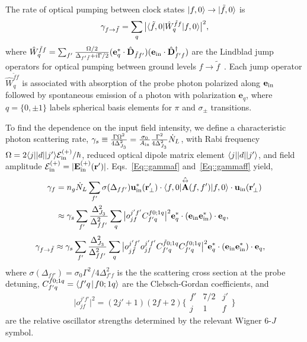 The rate of optical pumping between clock states $\ket{f,0} \rightarrow \ket{\tilde{f},0}$ is
	\begin{equation}\label{Eq::gammaff}
		\gamma_{f \rightarrow \tilde{f} } 
		=\sum_{q}\big| \bra{\tilde{f},0} \hat{W}_q^{\tilde{f}f} \ket{f,0} \big|^2,
	\end{equation}
where $ \hat{W}_q^{\tilde{f}f} = \sum_{f'}\frac{\Omega/2}{\Delta_{f'\tilde{f}}+i\Gamma/2}(\mathbf{e}_q^*\cdot\hat{\mathbf{D}}_{\tilde{f} f'} )(\mathbf{e}_{\rm in}\cdot \hat{\mathbf{D}}^\dagger_{f'f} ) $ are the Lindblad jump operators for optical pumping between ground levels $ f\rightarrow \tilde{f} $~\cite{deutsch_quantum_2010}. 
Each jump operator $\hat{W}_q^{\tilde{f}f}$ is associated with absorption of the probe photon polarized along $ \mathbf{e}_{\rm in} $ followed by spontaneous emission of a photon with polarization $ \mathbf{e}_q $, where $q= \{0,\pm 1\}$ labels spherical basis elements for $\pi$ and $ \sigma_\pm$ transitions.  

To find the dependence on the input field intensity, we define a characteristic photon scattering rate, $\gamma_s \equiv \frac{\Gamma\Omega^2}{4\Delta_{J_3}^2}= \frac{\sigma_0}{A_{\rm in}}\frac{\Gamma^2}{4 \Delta_{J_3}^2} \dot{N}_L $, with Rabi frequency $ \Omega=2\bra{j}|d|\ket{j'}\mathcal{E}^{(+)}_{\rm in}/\hbar $, reduced optical dipole matrix element $\bra{j}|d|\ket{j'}$, and field amplitude $ \mathcal{E}^{(+)}_{\rm in}=|\mathbf{E}_{\rm in}^{(+)}(\br')| $.
Eqs.~\eqref{Eq::gammaf} and~\eqref{Eq::gammaff} yield,
\begin{subequations}
	\begin{align}
		\gamma_f &=n_g\dot{N}_L  \sum_{f'} \sigma (\Delta_{ff'} ) \mathbf{u}^*_\inp(\br'_\perp)\cdot \bra{f,0} \hat{\tensor{\mbf{A}}}(f,f') \ket{f,0}  \cdot \mathbf{u}_\inp(\br'_\perp)\\
		&\approx  \gamma_s \sum_{f'} \frac{\Delta_{J_3}^2}{\Delta_{ff'}^2}\sum_q \big| o_{jf}^{j'f'}C_{f'q}^{f0;1 q} \big|^2 \mathbf{e}_q^* \cdot (\mathbf{e}_{\rm in}\mathbf{e}_{\rm in}^* )\cdot \mathbf{e}_q, 
	\end{align}
\end{subequations}
	\begin{align}
		\gamma_{f \rightarrow \tilde{f}} 
		&\approx \gamma_s \sum_{f'} \frac{\Delta_{J_3}^2}{\Delta_{ff'}^2}\sum_q \big| o_{j\tilde{f}}^{j'f'} o_{jf}^{j'f'}C_{f'q}^{\tilde{f}0;1 q}C_{f'q}^{f0;1q} \big|^2 \mathbf{e}_q^* \cdot (\mathbf{e}_{\rm in}\mathbf{e}_{\rm in}^* )\cdot \mathbf{e}_q,
	\end{align}
where $ \sigma (\Delta_{ff'} )  = \sigma_0 \Gamma^2/4\Delta^2_{f' f}$ is the the scattering cross section at the probe detuning, $ C_{f'q}^{f0;1 q}=\Braket{f'q}{f0;1q}$ are the Clebsch-Gordan coefficients, and
\begin{equation}
\big| o_{jf}^{j'f'} \big|^2=(2j'+1)(2f+2) \bigg\{
\begin{array}{ccc}
f' & 7/2 & j' \\
 j & 1 & f 
 \end{array}
 \bigg\}
\end{equation}
are the relative oscillator strengths determined by the relevant Wigner 6-$J$ symbol.

